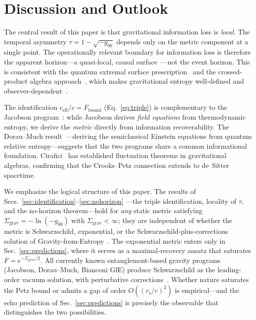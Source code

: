 \documentclass[prl,twocolumn,superscriptaddress,longbibliography,floatfix]{revtex4-2}
\newcommand{\tauasym}{\tau}
\newcommand{\ceff}{c_{\mathrm{eff}}}
\newcommand{\rs}{r_{\mathrm{s}}}
\newcommand{\Sgrav}{\Sigma_{\mathrm{grav}}}
\newcommand{\Fbound}{F_{\mathrm{bound}}}
\begin{document}
\section{Discussion and Outlook}
\label{sec:discussion}

The central result of this paper is that gravitational
information loss is \emph{local}.
The temporal asymmetry $\tauasym = 1 - \sqrt{-g_{00}}$
depends only on the metric component at a single point.
The operationally relevant boundary for information loss is
therefore the apparent horizon---a quasi-local, causal
surface~\cite{AshtekarKrishnan2004}---not the event
horizon.
This is consistent with the quantum extremal surface
prescription~\cite{Penington2020,Engelhardt2015} and the
crossed-product algebra approach~\cite{Witten2022,%
Chandrasekaran2023}, which makes gravitational entropy
well-defined and observer-dependent~\cite{KudlerFlam2025}.

The identification $\ceff/c = \Fbound$
(Eq.~\eqref{eq:triple}) is complementary to the Jacobson
program~\cite{Jacobson1995}: while Jacobson derives
\emph{field equations} from thermodynamic entropy, we derive
the \emph{metric} directly from information recoverability.
The Dorau--Much result~\cite{DorauMuch2025}---deriving the
semiclassical Einstein equations from quantum relative
entropy---suggests that the two programs share a common
informational foundation.
Cirafici~\cite{Cirafici2024} has established fluctuation
theorems in gravitational algebras, confirming that the
Crooks--Petz connection extends to de~Sitter spacetime.

We emphasize the logical structure of this paper.
The results of Secs.~\ref{sec:identification}--\ref{sec:nohorizon}
---the triple identification, locality of $\tauasym$,
and the no-horizon theorem---hold for \emph{any} static metric
satisfying $\Sgrav = -\ln(-g_{00})$ with $\Sgrav < \infty$;
they are independent of whether the metric is Schwarzschild,
exponential, or the Schwarzschild-plus-corrections solution of
Gravity-from-Entropy~\cite{Thattarampilly2026,Bianconi2025}.
The exponential metric enters only in Sec.~\ref{sec:predictions},
where it serves as a maximal-recovery ansatz that saturates
$F = e^{-\Sgrav/2}$.
All currently known entanglement-based gravity programs
(Jacobson, Dorau--Much, Bianconi GfE) produce Schwarzschild
as the leading-order vacuum solution, with perturbative
corrections~\cite{Thattarampilly2026}.
Whether nature saturates the Petz bound
or admits a gap of order $O((\rs/r)^2)$ is empirical---and
the echo prediction of Sec.~\ref{sec:predictions} is precisely
the observable that distinguishes the two possibilities.
\end{document}
